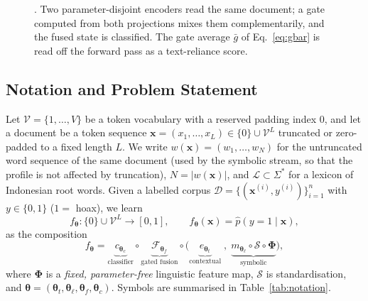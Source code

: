 \begin{figure}[t]
{}
\caption{\menet{}. Two parameter-disjoint encoders read the same document; a gate computed from both
projections mixes them complementarily, and the fused state is classified. The gate average
$\bar g$ of Eq.~\eqref{eq:gbar} is read off the forward pass as a text-reliance score.}
\label{fig:arch}
\end{figure}

\subsection{Notation and Problem Statement}
\label{sec:notation}

Let $\mathcal{V}=\{1,\dots,V\}$ be a token vocabulary with a reserved padding index $0$, and let a document
be a token sequence $\mathbf{x}=(x_1,\dots,x_L)\in\{0\}\cup\mathcal{V}^{L}$ truncated or zero-padded to a fixed
length $L$. We write $w(\mathbf{x})=(w_1,\dots,w_N)$ for the untruncated word sequence of the same document
(used by the symbolic stream, so that the profile is not affected by truncation), $N=|w(\mathbf{x})|$, and
$\mathcal{L}\subset\Sigma^{*}$ for a lexicon of Indonesian root words. Given a labelled corpus
$\mathcal{D}=\{(\mathbf{x}^{(i)},y^{(i)})\}_{i=1}^{n}$ with $y\in\{0,1\}$ ($1=$ hoax), we learn
\begin{equation}
f_{\bm{\theta}}:\{0\}\cup\mathcal{V}^{L}\longrightarrow[0,1],\qquad
f_{\bm{\theta}}(\mathbf{x})=\hat{p}(y=1\mid\mathbf{x}),
\end{equation}
as the composition
\begin{equation}
f_{\bm{\theta}}
=\underbrace{c_{\bm{\theta}_c}}_{\text{classifier}}\circ
\underbrace{\mathcal{F}_{\bm{\theta}_f}}_{\text{gated fusion}}\circ
\Big(\underbrace{e_{\bm{\theta}_t}}_{\text{contextual}}\;,\;
\underbrace{m_{\bm{\theta}_\ell}\circ\mathcal{S}\circ\bm{\Phi}}_{\text{symbolic}}\Big),
\end{equation}
where $\bm{\Phi}$ is a \emph{fixed, parameter-free} linguistic feature map, $\mathcal{S}$ is standardisation,
and $\bm{\theta}=(\bm{\theta}_t,\bm{\theta}_\ell,\bm{\theta}_f,\bm{\theta}_c)$. Symbols are summarised in
Table~\ref{tab:notation}.

